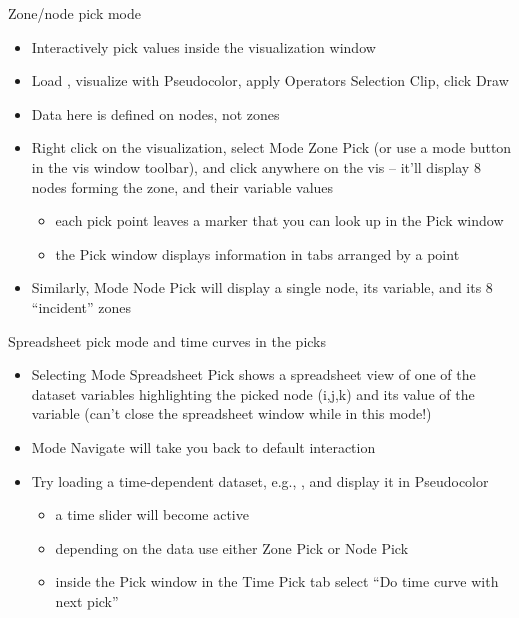 \begin{frame}{Zone/node pick mode}
  \begin{itemize}\setlength{\itemsep}{3mm}
  \item Interactively pick values inside the visualization window
  \item Load , visualize  with Pseudocolor, apply Operators \ra Selection \ra Clip,
    click Draw
  \item{\color{red} Data here is defined on nodes, not zones}
    \pause
  \item Right click on the visualization, select Mode \ra Zone Pick (or use a mode button in the vis
        window
    toolbar), and click anywhere on the vis -- it'll display 8 nodes forming the zone, and their variable
    values
    \begin{itemize}\setlength{\itemsep}{0mm}
    \item each pick point leaves a marker that you can look up in the Pick window
    \item the Pick window displays information in tabs arranged by a point
    \end{itemize}
    \pause
  \item Similarly, Mode \ra Node Pick will display a single node, its variable, and its 8 ``incident''
    zones
  \end{itemize}
\end{frame}

\begin{frame}{Spreadsheet pick mode and time curves in the picks}
  \begin{itemize}\setlength{\itemsep}{3mm}
  \item Selecting Mode \ra Spreadsheet Pick shows a spreadsheet view of one of the dataset variables
    highlighting the picked node (i,j,k) and its value of the variable (can't close the spreadsheet
    window while in this mode!)
    \pause
  \item Mode \ra Navigate will take you back to default interaction
    \pause
  \item Try loading a time-dependent dataset, e.g., , and display it in Pseudocolor
    \begin{itemize}\setlength{\itemsep}{0mm}
    \item a time slider will become active
    \item depending on the data use either Zone Pick or Node Pick
    \item inside the Pick window in the Time Pick tab select ``Do time curve with next pick''
    \end{itemize}
  \end{itemize}
\end{frame}


